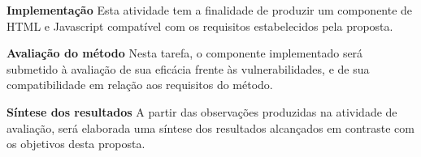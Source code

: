 \begin{alineas}
	\item \textbf{Implementação}
	Esta atividade tem a finalidade de produzir um componente de HTML e Javascript compatível com os requisitos estabelecidos pela proposta.
		
	\item\textbf{Avaliação do método}
	Nesta tarefa, o componente implementado será submetido à avaliação de sua eficácia frente às vulnerabilidades, e de sua compatibilidade em relação aos requisitos do método.
	
	\item \textbf{Síntese dos resultados}
	A partir das observações produzidas na atividade de avaliação, será elaborada uma síntese dos resultados alcançados em contraste com os objetivos desta proposta.
\end{alineas}
